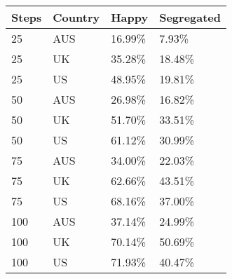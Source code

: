 \begin{table}[ht]
\centering
\begin{tabular}{llll}
  \hline
Steps & Country & Happy & Segregated \\ 
  \hline
25 & AUS & 16.99\% & 7.93\% \\ 
  25 & UK & 35.28\% & 18.48\% \\ 
  25 & US & 48.95\% & 19.81\% \\ 
  50 & AUS & 26.98\% & 16.82\% \\ 
  50 & UK & 51.70\% & 33.51\% \\ 
  50 & US & 61.12\% & 30.99\% \\ 
  75 & AUS & 34.00\% & 22.03\% \\ 
  75 & UK & 62.66\% & 43.51\% \\ 
  75 & US & 68.16\% & 37.00\% \\ 
  100 & AUS & 37.14\% & 24.99\% \\ 
  100 & UK & 70.14\% & 50.69\% \\ 
  100 & US & 71.93\% & 40.47\% \\ 
   \hline
\end{tabular}
\end{table}
